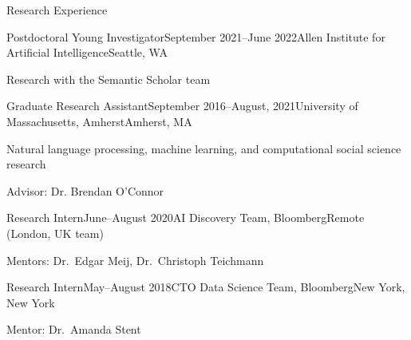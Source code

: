 \documentclass{resume} %
\begin{document}
\begin{rSection}{Research Experience}

\begin{rSubsection}{Postdoctoral Young Investigator}{September 2021--June 2022}{Allen Institute for Artificial Intelligence}{Seattle, WA}
\item Research with the Semantic Scholar team
\end{rSubsection}

\begin{rSubsection}{Graduate Research Assistant}{September 2016--August, 2021}{University of Massachusetts, Amherst}{Amherst, MA}
\item Natural language processing, machine learning, and computational social science research
\item Advisor: Dr. Brendan O'Connor 
\end{rSubsection}

\begin{rSubsection}{Research Intern}{June--August 2020}{AI Discovery Team, Bloomberg}{Remote (London, UK team)}
\item Mentors: Dr.~Edgar Meij, Dr.~Christoph Teichmann
\end{rSubsection}

\begin{rSubsection}{Research Intern}{May--August 2018}{CTO Data Science Team, Bloomberg}{New York, New York}
\item Mentor: Dr.~Amanda Stent
\end{rSubsection}



\end{rSection}
\end{document}
